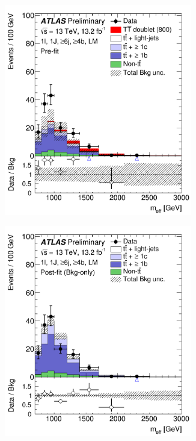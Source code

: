 \begin{figure}[p!]
\begin{subfigure}{0.24\textwidth}
  \caption{}
  \label{}
\end{subfigure}
\begin{subfigure}{0.24\textwidth}
  \centering
  \includegraphics[width=0.9\textwidth]{figures/VLQ/fig_10c.png}
  \caption{}
  \label{}
\end{subfigure}
\begin{subfigure}{0.24\textwidth}
  \centering
  \includegraphics[width=0.9\textwidth]{figures/VLQ/fig_10d.png}

\end{subfigure}
\end{figure}
